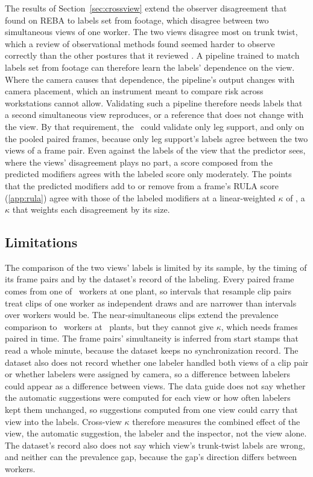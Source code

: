 \documentclass[review,3p,authoryear]{elsarticle}
\begin{document}
The results of Section~\ref{sec:crossview} extend the observer disagreement that
\citet{schwartz2019reba} found on REBA to labels set from footage, which disagree between
two simultaneous views of one worker. The two views disagree most on trunk twist, which a
review of observational methods found seemed harder to observe correctly than the other
postures that it reviewed \citep{takala2010observational}. A pipeline trained to
match labels set from footage can therefore learn the labels' dependence on the view. Where the camera causes that
dependence, the pipeline's output changes with camera placement, which an instrument meant
to compare risk across workstations cannot allow. Validating such a pipeline therefore
needs labels that a second simultaneous view reproduces, or a reference that does not
change with the view. By that requirement, the \datasetName\ could validate only leg
support, and only on the pooled paired frames, because only leg support's labels agree
between the two views of a frame pair. Even against the labels of the view that the predictor sees, where the views'
disagreement plays no part, a score composed from the predicted modifiers agrees with the
labeled score only moderately. The points that the predicted modifiers add to or remove
from a frame's RULA score (\ref{app:rula}) agree with those of the labeled modifiers at a
linear-weighted $\kappa$ of \adjKappaTotal, a $\kappa$ that weights each disagreement by
its size.

\subsection{Limitations}
\label{sec:limits}

The comparison of the two views' labels is limited by its sample, by the timing of its frame pairs and by the dataset's record
of the labeling. Every paired frame comes from one of \nXviewWorkers\ workers at one plant,
so intervals that resample clip pairs treat clips of one worker as independent draws and
are narrower than intervals over workers would be. The near-simultaneous clips extend the
prevalence comparison to \nTakePairWorkers\ workers at \nTakePairFactories\ plants, but
they cannot give $\kappa$, which needs frames paired in time. The frame pairs' simultaneity
is inferred from start stamps that read a whole minute, because the dataset keeps no
synchronization record. The dataset also does not record whether one labeler handled both
views of a clip pair or whether labelers were assigned by camera, so a difference between
labelers could appear as a difference between views. The data guide does not say whether
the automatic suggestions were computed for each view or how often labelers kept them
unchanged, so suggestions computed from one view could carry that view into the labels.
Cross-view $\kappa$ therefore measures the combined effect of the view, the automatic
suggestion, the labeler and the inspector, not the view alone. The dataset's record also does not say which view's trunk-twist labels
are wrong, and neither can the prevalence gap, because the gap's direction differs between
workers.
\end{document}
